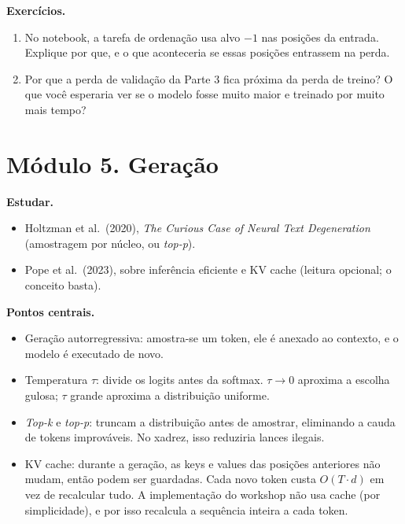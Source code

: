 \documentclass[
  11pt,
]{article}
\providecommand{\tightlist}{%
  \setlength{\itemsep}{0pt}\setlength{\parskip}{0pt}}
\begin{document}
\textbf{Exercícios.}

\begin{enumerate}
\def\labelenumi{\arabic{enumi}.}
\tightlist
\item
  No notebook, a tarefa de ordenação usa alvo \(-1\) nas posições da
  entrada. Explique por que, e o que aconteceria se essas posições
  entrassem na perda.
\item
  Por que a perda de validação da Parte 3 fica próxima da perda de
  treino? O que você esperaria ver se o modelo fosse muito maior e
  treinado por muito mais tempo?
\end{enumerate}

\section{Módulo 5. Geração}\label{muxf3dulo-5.-gerauxe7uxe3o}

\textbf{Estudar.}

\begin{itemize}
\tightlist
\item
  Holtzman et al.~(2020), \emph{The Curious Case of Neural Text
  Degeneration} (amostragem por núcleo, ou \emph{top-p}).
\item
  Pope et al.~(2023), sobre inferência eficiente e KV cache (leitura
  opcional; o conceito basta).
\end{itemize}

\textbf{Pontos centrais.}

\begin{itemize}
\tightlist
\item
  Geração autorregressiva: amostra-se um token, ele é anexado ao
  contexto, e o modelo é executado de novo.
\item
  Temperatura \(\tau\): divide os logits antes da softmax.
  \(\tau \to 0\) aproxima a escolha gulosa; \(\tau\) grande aproxima a
  distribuição uniforme.
\item
  \emph{Top-k} e \emph{top-p}: truncam a distribuição antes de amostrar,
  eliminando a cauda de tokens improváveis. No xadrez, isso reduziria
  lances ilegais.
\item
  KV cache: durante a geração, as keys e values das posições anteriores
  não mudam, então podem ser guardadas. Cada novo token custa
  \(O(T \cdot d)\) em vez de recalcular tudo. A implementação do
  workshop não usa cache (por simplicidade), e por isso recalcula a
  sequência inteira a cada token.
\end{itemize}
\end{document}

